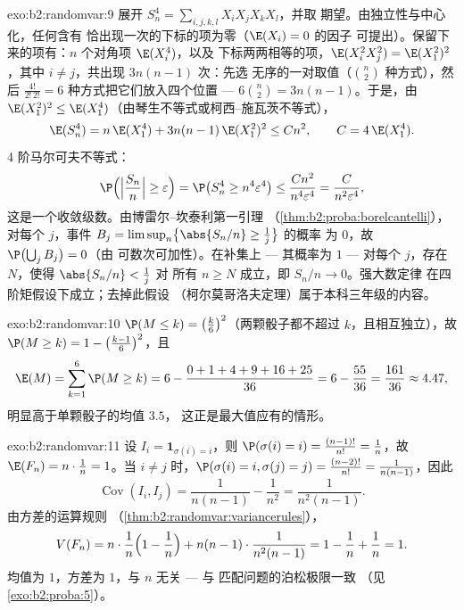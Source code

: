 \begin{solution}{exo:b2:randomvar:9}
展开 $S_n^4 = \sum_{i,j,k,l}X_iX_jX_kX_l$，并取
期望。由独立性与中心化，任何含有
恰出现一次的下标的项为零（$\E(X_i) = 0$ 的因子
可提出）。保留下来的项有：$n$ 个对角项 $\E(X_i^4)$，以及
下标两两相等的项，$\E(X_i^2X_j^2) =
\E(X_1^2)^2$，其中 $i \neq j$，共出现 $3n(n-1)$ 次：先选
无序的一对取值（$\binom n2$ 种方式），然后
$\frac{4!}{2!\,2!} = 6$ 种方式把它们放入四个位置 ---
$6\binom n2 = 3n(n-1)$。于是，由 $\E(X_1^2)^2
\leq \E(X_1^4)$（由琴生不等式或柯西–施瓦茨不等式），
\[
\E(S_n^4) = n\,\E(X_1^4) + 3n(n-1)\,\E(X_1^2)^2
\leq C n^2,
\qquad C = 4\,\E(X_1^4) .
\]
4 阶马尔可夫不等式：
\[
\P\Bigl(\Bigl|\frac{S_n}{n}\Bigr| \geq \varepsilon\Bigr)
= \P\bigl(S_n^4 \geq n^4\varepsilon^4\bigr)
\leq \frac{Cn^2}{n^4\varepsilon^4}
= \frac{C}{n^2\varepsilon^4} ,
\]
这是一个收敛级数。由博雷尔–坎泰利第一引理
（\cref{thm:b2:proba:borelcantelli}），对每个 $j$，事件
$B_j = \limsup_n\bigl\{\abs{S_n/n} \geq \frac1j\bigr\}$ 的概率
为 $0$，故 $\P\bigl(\bigcup_j B_j\bigr) = 0$（由
可数次可加性）。在补集上 --- 其概率为 $1$
--- 对每个 $j$，存在 $N$，使得 $\abs{S_n/n} < \frac1j$ 对
所有 $n \geq N$ 成立，即 $S_n/n \to 0$。强大数定律
在四阶矩假设下成立；去掉此假设
（柯尔莫哥洛夫定理）属于本科三年级的内容。
\end{solution}

\begin{solution}{exo:b2:randomvar:10}
$\P(M \leq k) = \bigl(\frac k6\bigr)^2$（两颗骰子都不超过
$k$，且相互独立），故 $\P(M \geq k) = 1 -
\bigl(\frac{k-1}6\bigr)^2$，且
\[
\E(M) = \sum_{k=1}^6\P(M \geq k)
= 6 - \frac{0 + 1 + 4 + 9 + 16 + 25}{36}
= 6 - \frac{55}{36} = \frac{161}{36} \approx 4.47 ,
\]
明显高于单颗骰子的均值 $3.5$，
这正是最大值应有的情形。
\end{solution}

\begin{solution}{exo:b2:randomvar:11}
设 $I_i = \mathbf 1_{\sigma(i) = i}$，则 $\P(\sigma(i) = i) =
\frac{(n-1)!}{n!} = \frac1n$，故 $\E(F_n) = n\cdot\frac1n =
1$。当 $i \neq j$ 时，$\P(\sigma(i) = i, \sigma(j) = j) =
\frac{(n-2)!}{n!} = \frac1{n(n-1)}$，因此
\[
\operatorname{Cov}(I_i, I_j) = \frac1{n(n-1)} - \frac1{n^2}
= \frac{1}{n^2(n-1)} .
\]
由方差的运算规则
（\cref{thm:b2:randomvar:variancerules}），
\[
V(F_n) = n\cdot\frac1n\Bigl(1 - \frac1n\Bigr)
+ n(n-1)\cdot\frac1{n^2(n-1)}
= 1 - \frac1n + \frac1n = 1 .
\]
均值为 $1$，方差为 $1$，与 $n$ 无关 --- 与
匹配问题的泊松极限一致
（见\cref{exo:b2:proba:5}）。
\end{solution}

